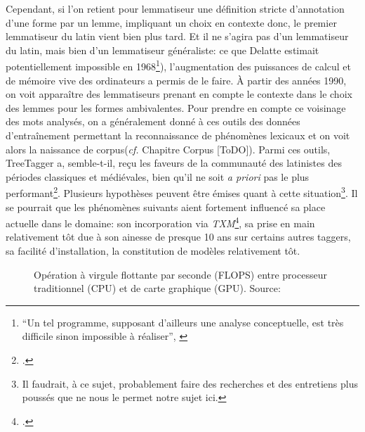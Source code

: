 Cependant, si l'on retient pour lemmatiseur une définition stricte d'annotation d'une forme par un lemme, impliquant un choix en contexte donc, le premier lemmatiseur du latin vient bien plus tard. Et il ne s'agira pas d'un lemmatiseur du latin, mais bien d'un lemmatiseur généraliste: ce que Delatte estimait potentiellement impossible en 1968\footnote{\enquote{Un tel programme, supposant d'ailleurs une analyse conceptuelle, est très difficile sinon impossible à réaliser}, \cite[p.~100]{delatte_index_1968}}), l'augmentation des puissances de calcul et de mémoire vive des ordinateurs a permis de le faire. À partir des années 1990, on voit apparaître des lemmatiseurs prenant en compte le contexte dans le choix des lemmes pour les formes ambivalentes. %
Pour prendre en compte ce voisinage des mots analysés, on a généralement donné à ces outils des données d'entraînement permettant la reconnaissance de phénomènes lexicaux et on voit alors la naissance de corpus(\textit{cf.} Chapitre Corpus [ToDO]). Parmi ces outils, TreeTagger a, semble-t-il, reçu les faveurs de la communauté des latinistes des périodes classiques et médiévales, bien qu'il ne soit \textit{a priori} pas le plus performant\footcite[Voir]{eger_lexicon-assisted_2015}. Plusieurs hypothèses peuvent être émises quant à cette situation\footnote{Il faudrait, à ce sujet, probablement faire des recherches et des entretiens plus poussés que ne nous le permet notre sujet ici.}. Il se pourrait que les phénomènes suivants aient fortement influencé sa place actuelle dans le domaine: son incorporation via \textit{TXM}\footcite{heiden:halshs-00549779}, sa prise en main relativement tôt due à son ainesse de presque 10 ans sur certains autres taggers, sa facilité d'installation, la constitution de modèles relativement tôt. 


\begin{figure}[h]
    \centering
    \caption{Opération à virgule flottante par seconde (FLOPS) entre processeur traditionnel (CPU) et de carte graphique (GPU). Source: \cite{noauthor_cuda_nodate}}
    \label{lemmatisation:histoire:puissance-gpu}
\end{figure}


